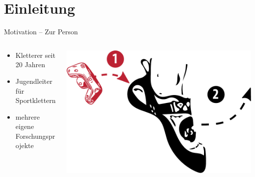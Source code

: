 \section{Einleitung}

\begin{frame}{Motivation -- Zur Person}
  \begin{columns}
	\begin{column}{0.4\textwidth}
		\begin{itemize}[label=\textcolor{tertiary}{}]
			\item Kletterer seit 20 Jahren
			\item Jugendleiter für Sportklettern
			\item mehrere eigene Forschungsprojekte
		\end{itemize}
	\end{column}
	\begin{column}{0.5\textwidth}
		\begin{center}
			\includegraphics[width=0.8\columnwidth]{include/images/climbing-shoe-with-instructions-on.pdf}
		\end{center}
	\end{column}
\end{columns}
\end{frame}

